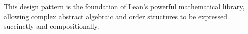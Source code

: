 This design pattern is the foundation of Lean’s powerful mathematical library, 
allowing complex abstract algebraic and order structures to be expressed succinctly and compositionally.


